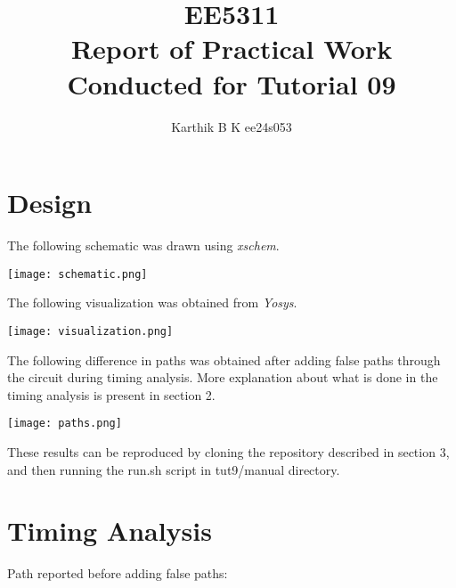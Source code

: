 \documentclass[12pt,a4paper]{article}
\begin{document}
\title{EE5311 \\ Report of Practical Work Conducted for Tutorial 09}
\author{Karthik B K ee24s053}
\maketitle

\section{Design}
\noindent The following schematic was drawn using \emph{xschem}.
\begin{center}
\texttt{[image: schematic.png]}
\end{center}

\noindent The following visualization was obtained from \emph{Yosys}.
\begin{center}
\texttt{[image: visualization.png]}
\end{center}

\noindent The following difference in paths was obtained after adding false paths through the circuit during timing analysis. More explanation about what is done in the timing analysis is present in section 2.
\begin{center}
\texttt{[image: paths.png]}
\end{center}

\noindent These results can be reproduced by cloning the repository described in section 3, and then running the run.sh script in tut9/manual directory.

\section{Timing Analysis}
Path reported before adding false paths:
\end{document}
